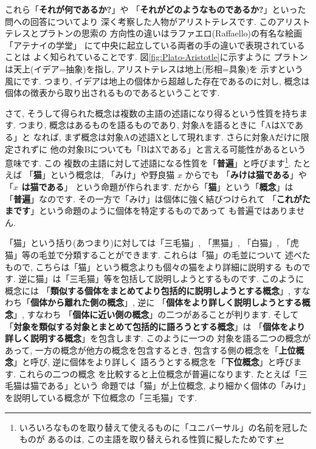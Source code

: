 これら「\textbf{それが何であるか?}」や
「\textbf{それがどのようなものであるか?}」といった問への回答についてより
深く考察した人物がアリストテレスです. このアリストテレスとプラトンの思索の
方向性の違いはラファエロ(Raffaello)の有名な絵画「アテナイの学堂」
\cite{アテナイ}にて中央に起立している両者の手の違いで表現されていることは
よく知られていることです. 図\ref{fig:Plato-Aristotle}に示すように
プラトンは天上(イデア=抽象)を指し, アリストテレスは地上(形相=具象)を
示すという風にです. つまり, イデアは地上の個体から超越した存在であるのに対し,
 概念は個体の徴表から取り出されるものであるということです.
\newline

さて, そうして得られた概念は複数の主語の述語になり得るという性質を持ちます.
 つまり, 概念はあるものを語るものであり, 対象Aを語るときに「AはXである」と
なれば, まず概念は対象Aの述語Xとして現れます. さらに対象Aだけに限定されずに
他の対象Bについても「BはXである」と言える可能性があるという意味です. この
複数の主語に対して述語になる性質を「\textbf{普遍}」と呼びます\footnote{
いろいろなものを取り替えて使えるものに「ユニバーサル」の名前を冠したものが
あるのは, この主語を取り替えられる性質に擬したためです.}. たとえば
「\textbf{猫}」という概念は, 「みけ」や野良猫 $x$ からでも
「\textbf{みけは猫である}」や 「\textbf{$x$ は猫である}」
という命題が作られます. だから「\textbf{猫}」という「\textbf{概念}」は
「\textbf{普遍}」なのです. その一方で「みけ」は個体に強く結びつけられて
「\textbf{これがたまです}」という命題のように個体を特定するものであって
も普遍ではありません.
\newline

「猫」という括り(あつまり)に対しては「三毛猫」, 「黒猫」, 「白猫」,
 「虎猫」等の毛並で分類することができます. これらは「猫」の毛並について
述べたもので, こちらは「猫」という概念よりも個々の猫をより詳細に説明する
ものです. 逆に猫」は「三毛猫」等を包括して説明しようとするものです.
 このように概念には
「\textbf{類似する個体をまとめてより包括的に説明しようとする概念}」,
 すなわち「\textbf{個体から離れた側の概念}」, 逆に
「\textbf{個体をより詳しく説明しようとする概念}」, すなわち
「\textbf{個体に近い側の概念}」の二つがあることが判ります. そして
「\textbf{対象を類似する対象とまとめて包括的に語ろうとする概念}」は
「\textbf{個体をより詳しく説明する概念}」を包含します. このように一つの
対象を語る二つの概念があって, 一方の概念が他方の概念を包含するとき,
 包含する側の概念を「\textbf{上位概念}」と呼び, 逆に個体をより詳しく
語ろうとする概念を「\textbf{下位概念}」と呼びます. これらの二つの概念
を比較すると上位概念が普遍になります. たとえば「三毛猫は猫である」という
命題では「猫」が上位概念, より細かく個体の「みけ」を説明している概念が
下位概念の「三毛猫」です.
\newline

